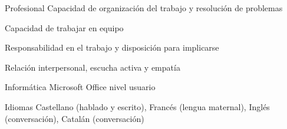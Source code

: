 

\begin{cvskills}

  \cvskill
    {Profesional} %
    {Capacidad de organización del trabajo y resolución de problemas} %

  \cvskill
    {} %
    {Capacidad de trabajar en equipo} %

  \cvskill
    {} %
    {Responsabilidad en el trabajo y disposición para implicarse} %

  \cvskill
    {} %
    {Relación interpersonal, escucha activa y empatía} %

  \cvskill
    {Informática} %
    {Microsoft Office nivel usuario} %

  \cvskill
    {Idiomas} %
    {Castellano (hablado y escrito), Francés (lengua maternal), Inglés (conversación), Catalán (conversación)} %

\end{cvskills}
